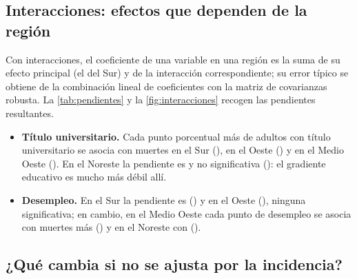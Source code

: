 


\subsection{Interacciones: efectos que dependen de la región}\label{sec:interacciones-interp}

Con interacciones, el coeficiente de una variable en una región es la suma de su efecto principal
(el del Sur) y de la interacción correspondiente; su error típico se obtiene de la combinación
lineal de coeficientes con la matriz de covarianzas robusta. La \cref{tab:pendientes} y la
\cref{fig:interacciones} recogen las pendientes resultantes.

\begin{itemize}
  \item \textbf{Título universitario.} Cada punto porcentual más de adultos con título universitario
  se asocia con  muertes en el Sur (),
   en el Oeste () y 
  en el Medio Oeste (). En el Noreste la pendiente es
   y no significativa (): el gradiente
  educativo es mucho más débil allí.
  \item \textbf{Desempleo.} En el Sur la pendiente es 
  () y en el Oeste 
  (), ninguna significativa; en cambio, en el Medio Oeste cada punto de
  desempleo se asocia con  muertes más
  () y en el Noreste con 
  ().
\end{itemize}




\subsection{¿Qué cambia si no se ajusta por la incidencia?}

